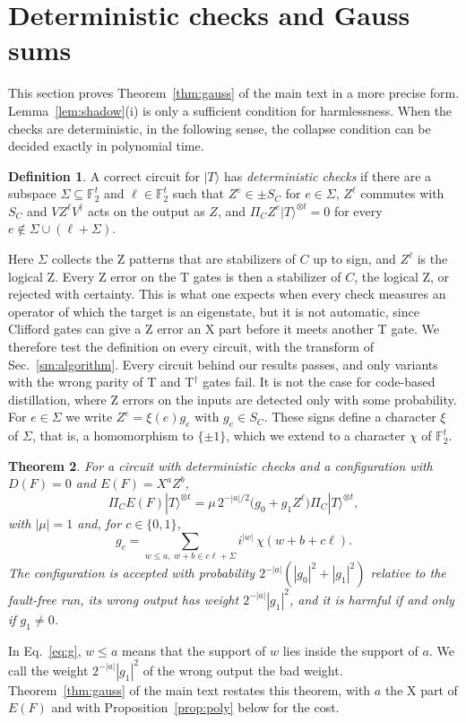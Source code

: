 \documentclass[aps,prl,reprint,twocolumn,amsmath,amssymb,floatfix,nofootinbib,superscriptaddress]{revtex4-2}
\newtheorem{theorem}{Theorem}
\theoremstyle{definition}
\newtheorem{definition}[theorem]{Definition}
\theoremstyle{remark}
\newcommand{\F}{\mathbb F_2}
\begin{document}
\section{Deterministic checks and Gauss sums}\label{sm:gauss}
This section proves Theorem~\ref{thm:gauss} of the main text in a more precise form. Lemma~\ref{lem:shadow}(i) is only a sufficient condition for harmlessness. When the checks are deterministic, in the following sense, the collapse condition can be decided exactly in polynomial time.
\begin{definition}\label{def:dc}
A correct circuit for $|T\rangle$ has \emph{deterministic checks} if there are a subspace $\Sigma\subseteq\F^t$ and $\ell\in\F^t$ such that $Z^e\in\pm S_C$ for $e\in\Sigma$, $Z^\ell$ commutes with $S_C$ and $VZ^\ell V^\dagger$ acts on the output as $Z$, and $\Pi_CZ^e|T\rangle^{\otimes t}=0$ for every $e\notin\Sigma\cup(\ell+\Sigma)$.
\end{definition}
Here $\Sigma$ collects the Z patterns that are stabilizers of $C$ up to sign, and $Z^\ell$ is the logical Z. Every Z error on the T gates is then a stabilizer of $C$, the logical Z, or rejected with certainty. This is what one expects when every check measures an operator of which the target is an eigenstate, but it is not automatic, since Clifford gates can give a Z error an X part before it meets another T gate. We therefore test the definition on every circuit, with the transform of Sec.~\ref{sm:algorithm}. Every circuit behind our results passes, and only variants with the wrong parity of T and T$^\dagger$ gates fail. It is not the case for code-based distillation, where Z errors on the inputs are detected only with some probability. For $e\in\Sigma$ we write $Z^e=\xi(e)g_e$ with $g_e\in S_C$. These signs define a character $\xi$ of $\Sigma$, that is, a homomorphism to $\{\pm1\}$, which we extend to a character $\chi$ of $\F^t$.
\begin{theorem}\label{thm:gaussfull}
For a circuit with deterministic checks and a configuration with $D(F)=0$ and $E(F)=X^aZ^b$,
\begin{equation}
 \Pi_CE(F)|T\rangle^{\otimes t}=\mu\,2^{-|a|/2}\bigl(g_0+g_1Z^\ell\bigr)\Pi_C|T\rangle^{\otimes t},
 \label{eq:out}
\end{equation}
with $|\mu|=1$ and, for $c\in\{0,1\}$,
\begin{equation}
 g_c=\sum_{w\leq a,\;w+b\in c\ell+\Sigma}i^{|w|}\,\chi(w+b+c\ell).
 \label{eq:g}
\end{equation}
The configuration is accepted with probability $2^{-|a|}(|g_0|^2+|g_1|^2)$ relative to the fault-free run, its wrong output has weight $2^{-|a|}|g_1|^2$, and it is harmful if and only if $g_1\neq0$.
\end{theorem}
In Eq.~\eqref{eq:g}, $w\leq a$ means that the support of $w$ lies inside the support of $a$. We call the weight $2^{-|a|}|g_1|^2$ of the wrong output the bad weight. Theorem~\ref{thm:gauss} of the main text restates this theorem, with $a$ the X part of $E(F)$ and with Proposition~\ref{prop:poly} below for the cost.
\end{document}
